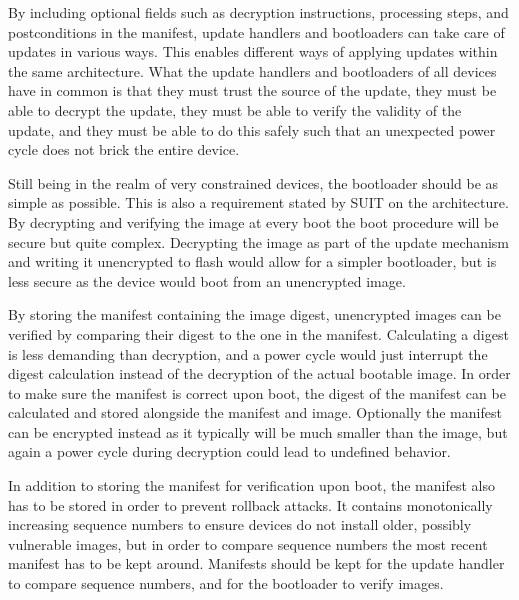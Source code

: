 \documentclass[0-thesis.tex]{subfiles}
\begin{document}
By including optional fields such as decryption instructions, processing steps, and
postconditions in the manifest, update handlers and bootloaders can take care of updates
in various ways. This enables different ways of applying updates within the same
architecture. What the update handlers and bootloaders of all devices have in common is
that they must trust the source of the update, they must be able to decrypt the update,
they must be able to verify the validity of the update, and they must be able to do this
safely such that an unexpected power cycle does not brick the entire device.

Still being in the realm of very constrained devices, the bootloader should be as simple
as possible. This is also a requirement stated by SUIT on the architecture. By decrypting
and verifying the image at every boot the boot procedure will be secure but quite complex.
Decrypting the image as part of the update mechanism and writing it unencrypted to flash
would allow for a simpler bootloader, but is less secure as the device would boot from an
unencrypted image.

By storing the manifest containing the image digest, unencrypted images can be verified by
comparing their digest to the one in the manifest. Calculating a digest is less demanding
than decryption, and a power cycle would just interrupt the digest calculation instead of
the decryption of the actual bootable image. In order to make sure the manifest is correct
upon boot, the digest of the manifest can be calculated and stored alongside the manifest
and image. Optionally the manifest can be encrypted instead as it typically will be much
smaller than the image, but again a power cycle during decryption could lead to undefined
behavior.

In addition to storing the manifest for verification upon boot, the manifest also has to
be stored in order to prevent rollback attacks. It contains monotonically increasing
sequence numbers to ensure devices do not install older, possibly vulnerable images, but
in order to compare sequence numbers the most recent manifest has to be kept around.
Manifests should be kept for the update handler to compare sequence numbers, and for the
bootloader to verify images.
\end{document}
